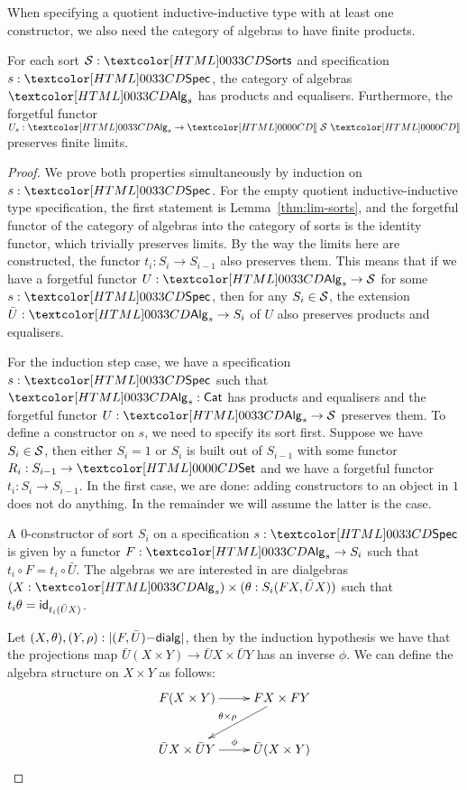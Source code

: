 When specifying a quotient inductive-inductive type with at least one
constructor, we also need the category of algebras to have finite
products.

\begin{lemma}
  For each sort $\Ss : \Sorts$ and specification $s : \Spec$, the
  category of algebras $\Alg_s$ has products and
  equalisers. Furthermore, the forgetful functor
  $U_s : \Alg_s \to \SortCat{\Ss}$ preserves finite limits.
\end{lemma}
\begin{proof}
  We prove both properties simultaneously by induction on $s : \Spec$.
  For the empty quotient inductive-inductive type specification, the
  first statement is Lemma~\ref{thm:lim-sorts}, and the forgetful
  functor of the category of algebras into the category of sorts is
  the identity functor, which trivially preserves limits. By the way
  the limits here are constructed, the functor $t_i : S_i \to S_{i-1}$
  also preserves them. This means that if we have a forgetful functor
  $U : \Alg_s \to \Ss$ for some $s : \Spec$, then for any
  $S_i \in \mathcal{S}$, the extension $\bar{U} : \Alg_s \to S_i$ of $U$ also
  preserves products and equalisers.

  For the induction step case, we have a specification $s : \Spec$
  such that $\Alg_s : \Cat$ has products and equalisers and the
  forgetful functor $U : \Alg_s \to \Ss$ preserves them. To define a
  constructor on $s$, we need to specify its sort first. Suppose we
  have $S_i \in \mathcal{S}$, then either $S_i = 1$ or $S_i$ is built out of
  $S_{i-1}$ with some functor $R_i : S_{i-1} \to \Set$ and we have a
  forgetful functor $t_i : S_i \to S_{i-1}$. In the first case, we are
  done: adding constructors to an object in $1$ does not do
  anything. In the remainder we will assume the latter is the case.

  A 0-constructor of sort $S_i$ on a specification $s : \Spec$ is
  given by a functor $F : \Alg_s \to S_i$ such that
  $t_i \circ F = t_i \circ \bar{U}$. The algebras we are interested in
  are dialgebras $(X : \Alg_s) \times (\theta : S_i(FX, \bar{U}X))$
  such that $t_i \theta = \mathsf{id}_{t_i (\bar{U}X)}$.

  Let $(X,\theta), (Y,\rho) : | (F,\bar{U})\mathsf{-dialg} |$, then by the
  induction hypothesis we have that the projections map
  $\bar{U}(X \times Y) \to \bar{U}X \times \bar{U}Y$ has an inverse
  $\phi$. We can define the algebra structure on $X \times Y$ as
  follows:
  $$
  \xymatrix{ F(X \times Y) \ar[r] &
    FX \times FY \ar[ld]_{\theta \times \rho} \\
    \bar{U}X \times \bar{U}Y \ar[r]^{\phi} & \bar{U}(X \times Y) }
  $$


\end{proof}
